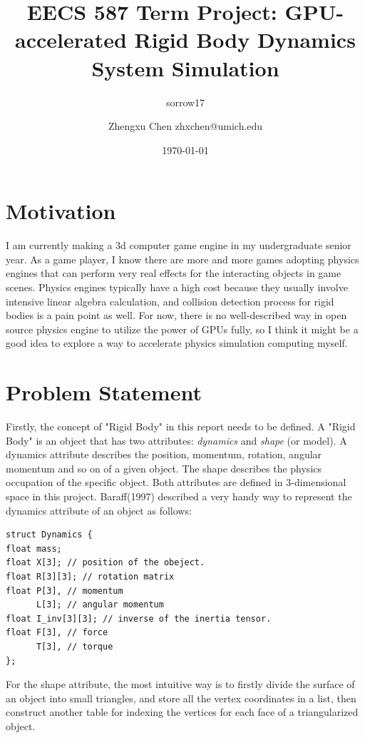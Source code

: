 \documentclass[11pt]{article}
\author{sorrow17}
\date{\today}
\title{}
\begin{document}
\title{EECS 587 Term Project: GPU-accelerated Rigid Body Dynamics System Simulation}
\author{Zhengxu Chen \quad zhxchen@umich.edu}

\maketitle

\section{Motivation}
\label{sec:org55df02d}
I am currently making a 3d computer game engine in my undergraduate senior year. As a game player, I know there are more and more games adopting physics engines that can perform very real effects for the interacting objects in game scenes. Physics engines typically have a high cost because they usually involve intensive linear algebra calculation, and collision detection process for rigid bodies is a pain point as well. For now, there is no well-described way in open source physics engine to utilize the power of GPUs fully, so I think it might be a good idea to explore a way to accelerate physics simulation computing myself.

\section{Problem Statement}
\label{sec:org95fcb18}
Firstly, the concept of "Rigid Body" in this report needs to be defined. A "Rigid Body" is an object that has two attributes: \emph{dynamics} and \emph{shape} (or model). A dynamics attribute describes the position, momentum, rotation, angular momentum and so on of a given object. The shape describes the physics occupation of the specific object. Both attributes are defined in 3-dimensional space in this project. Baraff(1997) described a very handy way to represent the dynamics attribute of an object as follows:

\begin{verbatim}
struct Dynamics {
float mass;
float X[3]; // position of the obeject.
float R[3][3]; // rotation matrix
float P[3], // momentum
      L[3]; // angular momentum
float I_inv[3][3]; // inverse of the inertia tensor.
float F[3], // force
      T[3], // torque
};
\end{verbatim}

For the shape attribute, the most intuitive way is to firstly divide the surface of an object into small triangles, and store all the vertex coordinates in a list, then construct another table for indexing the vertices for each face of a triangularized object.
\end{document}
